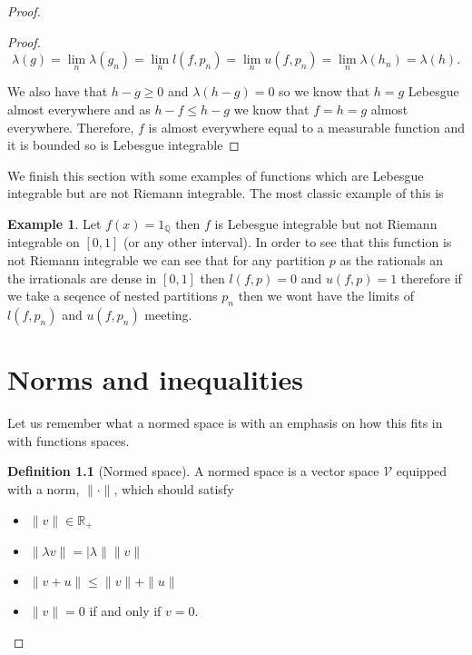 \documentclass[
]{book}
\providecommand{\tightlist}{%
  \setlength{\itemsep}{0pt}\setlength{\parskip}{0pt}}
\theoremstyle{definition}
\newtheorem{definition}{Definition}[chapter]
\theoremstyle{definition}
\newtheorem{example}{Example}[chapter]
\theoremstyle{definition}
\theoremstyle{definition}
\theoremstyle{remark}
\begin{document}
\begin{proof}
\begin{proof}
\[ \lambda (g) = \lim_n \lambda(g_n) = \lim_n l(f,p_n) = \lim_n u(f,p_n) = \lim_n \lambda(h_n) = \lambda(h). \]

We also have that \(h-g \geq 0\) and \(\lambda(h-g) = 0\) so we know that \(h=g\) Lebesgue almost everywhere and as \(h-f \leq h-g\) we know that \(f=h=g\) almost everywhere. Therefore, \(f\) is almost everywhere equal to a measurable function and it is bounded so is Lebesgue integrable
\end{proof}

We finish this section with some examples of functions which are Lebesgue integrable but are not Riemann integrable. The most classic example of this is

\begin{example}
Let \(f(x) = 1_{\mathbb{Q}}\) then \(f\) is Lebesgue integrable but not Riemann integrable on \([0,1]\) (or any other interval). In order to see that this function is not Riemann integrable we can see that for any partition \(p\) as the rationals an the irrationals are dense in \([0,1]\) then \(l(f,p) =0\) and \(u(f,p) =1\) therefore if we take a seqence of nested partitions \(p_n\) then we wont have the limits of \(l(f,p_n)\) and \(u(f,p_n)\) meeting.
\end{example}

\hypertarget{norms-and-inequalities}{%
\chapter{Norms and inequalities}\label{norms-and-inequalities}}

Let us remember what a normed space is with an emphasis on how this fits in with functions spaces.

\begin{definition}[Normed space]

A normed space is a vector space \(\mathcal{V}\) equipped with a norm, \(\|\cdot\|\), which should satisfy

\begin{itemize}
\tightlist
\item
  \(\| v\| \in \mathbb{R}_+\)
\item
  \(\| \lambda v\| = |\lambda\| \|v\|\)
\item
  \(\|v+u\| \leq \|v\| + \|u\|\)
\item
  \(\|v\|=0\) if and only if \(v=0\).
\end{itemize}

\end{definition}


\end{proof}
\end{document}

